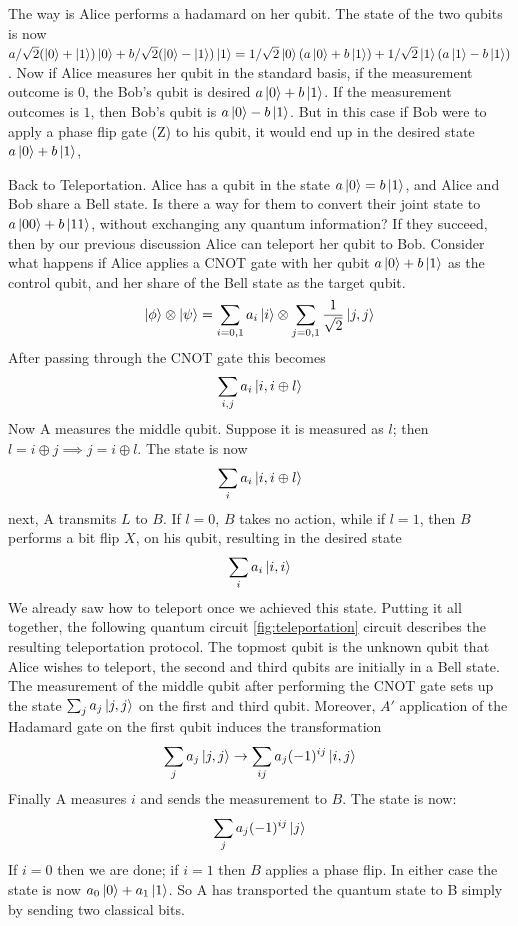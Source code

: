     The way is Alice performs a hadamard on her qubit. The state of the two qubits is now $a/\sqrt{2}(\ket{0}+\ket{1})\ket{0}+b/\sqrt{2}(\ket{0}-\ket{1})\ket{1}=1/\sqrt{2}\ket{0}(a\ket{0}+b\ket{1})+1/\sqrt{2}\ket{1}(a\ket{1}-b\ket{1})$. Now if Alice measures her qubit in the standard basis, if the measurement outcome is 0, the Bob's qubit is desired $a\ket{0}+b\ket{1}$. If the measurement outcomes is $1$, then Bob's qubit is $a\ket{0}-b\ket{1}$. But in this case if Bob were to apply a phase flip gate (Z) to his qubit, it would end up in the desired state $a\ket{0}+b\ket{1}$,
    
    Back to Teleportation. Alice has a qubit in the state $a\ket{0}=b\ket{1}$, and Alice and Bob share a Bell state. Is there a way for them to convert their joint state to $a\ket{00}+b\ket{11}$, without exchanging any quantum information? If they succeed, then by our previous discussion Alice can teleport her qubit to Bob. Consider what happens if Alice applies a CNOT gate with her qubit $a\ket{0}+b\ket{1}$ as the control qubit, and her share of the Bell state as the target qubit.
    \[
    \ket{\phi} \otimes \ket{\psi} = \sum_{i=0,1} a_i\ket{i} \otimes \sum_{j=0,1} \frac{1}{\sqrt{2}} \ket{j,j}
    \]
    After passing through the CNOT gate this becomes
    \[
    \sum_{i,j} a_i\ket{i,i \oplus l}
    \]
    Now A measures the middle qubit. Suppose it is measured as $l$; then $l=i\oplus j \implies j=i\oplus l$. The state is now
    \[
    \sum_i a_i\ket{i,i\oplus l}
    \]
    next, A transmits $L$ to $B$. If $l=0$, $B$ takes no action, while if $l=1$, then $B$ performs a bit flip $X$, on his qubit, resulting in the desired state
    \[
    \sum_i a_i\ket{i,i}
    \]
    We already saw how to teleport once we achieved this state. Putting it all together, the following quantum circuit \ref{fig:teleportation} circuit describes the resulting teleportation protocol. The topmost qubit is the unknown qubit that Alice wishes to teleport, the second and third qubits are initially in a Bell state. The measurement of the middle qubit after performing the CNOT gate sets up the state $\sum_j a_j\ket{j,j}$ on the first and third qubit. Moreover, $A'$ application of the Hadamard gate on the first qubit induces the transformation
    \[
    \sum_j a_j\ket{j,j} \rightarrow \sum_{ij} a_j (-1)^{ij} \ket{i,j}
    \]
    Finally A measures $i$ and sends the measurement to $B$. The state is now:
    \[
    \sum_j a_j (-1)^{ij} \ket{j}
    \]
    If $i=0$ then we are done; if $i=1$ then $B$ applies a phase flip. In either case the state is now $a_0\ket{0}+a_1\ket{1}$. So A has transported the quantum state to B simply by sending two classical bits.
